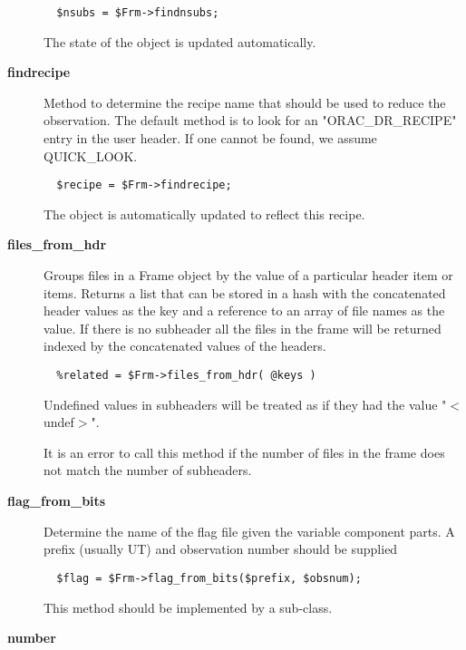 \begin{description}
\begin{verbatim}
  $nsubs = $Frm->findnsubs;
\end{verbatim}


The state of the object is updated automatically.


\item[{\textbf{findrecipe}}] \mbox{}

Method to determine the recipe name that should be used to reduce the
observation.  The default method is to look for an "ORAC\_DR\_RECIPE" entry
in the user header. If one cannot be found, we assume QUICK\_LOOK.

\begin{verbatim}
  $recipe = $Frm->findrecipe;
\end{verbatim}


The object is automatically updated to reflect this recipe.


\item[{\textbf{files\_from\_hdr}}] \mbox{}

Groups files in a Frame object by the value of a particular header
item or items. Returns a list that can be stored in a hash with the
concatenated header values as the key and a reference to an array of
file names as the value. If there is no subheader all the files in the
frame will be returned indexed by the concatenated values of the headers.

\begin{verbatim}
  %related = $Frm->files_from_hdr( @keys )
\end{verbatim}


Undefined values in subheaders will be treated as if they had the
value "$<$undef$>$".



It is an error to call this method if the number of files
in the frame does not match the number of subheaders.


\item[{\textbf{flag\_from\_bits}}] \mbox{}

Determine the name of the flag file given the variable
component parts. A prefix (usually UT) and observation number
should be supplied

\begin{verbatim}
  $flag = $Frm->flag_from_bits($prefix, $obsnum);
\end{verbatim}


This method should be implemented by a sub-class.


\item[{\textbf{number}}] \mbox{}


\end{description}
